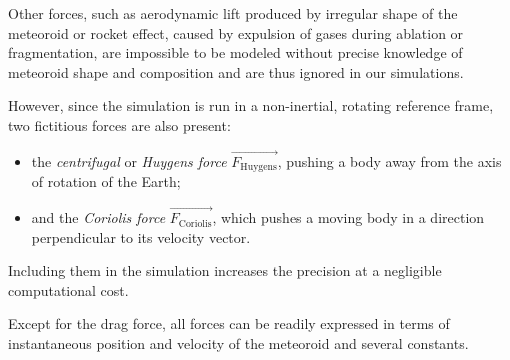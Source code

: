     Other forces, such as aerodynamic lift produced by irregular shape of the meteoroid
    or rocket effect, caused by expulsion of gases during ablation or fragmentation,
    are impossible to be modeled without precise knowledge of meteoroid shape and composition
    and are thus ignored in our simulations.

    However, since the simulation is run in a non-inertial, rotating reference frame,
    two fictitious forces are also present:
    \begin{itemize}
        \item the \emph{centrifugal} or \emph{Huygens force} $\vec{F_{\mathrm{Huygens}}}$,
            pushing a body away from the axis of rotation of the Earth;
        \item and the \emph{Coriolis force} $\vec{F_{\mathrm{Coriolis}}}$,
            which pushes a moving body in a direction perpendicular to its velocity vector.
    \end{itemize}
    Including them in the simulation increases the precision at a negligible computational cost.

    Except for the drag force, all forces can be readily expressed in terms of instantaneous
    position and velocity of the meteoroid and several constants.
%
%

